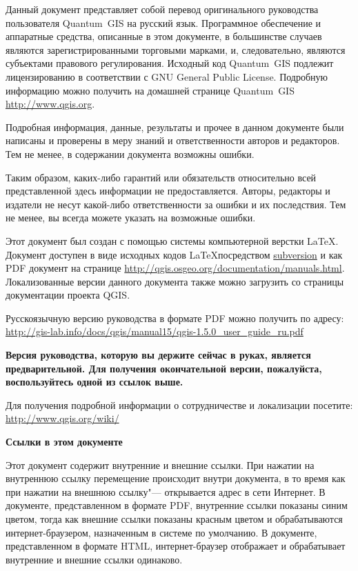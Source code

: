 \frontmatter
\pagestyle{scrplain}
\vspace{1cm}


Данный документ представляет собой перевод оригинального руководства
пользователя Quantum~GIS на русский язык. Программное обеспечение и
аппаратные средства, описанные в этом документе, в большинстве случаев
являются зарегистрированными торговыми марками, и, следовательно, являются
субъектами правового регулирования. Исходный код Quantum~GIS подлежит
лицензированию в соответствии с GNU General Public License. Подробную
информацию можно получить на домашней странице Quantum~GIS
\url{http://www.qgis.org}.
\par\bigskip
Подробная информация, данные, результаты и прочее в данном документе
были написаны и проверены в меру знаний и ответственности авторов и
редакторов. Тем не менее, в содержании документа возможны ошибки.
\par\bigskip
Таким образом, каких-либо гарантий или обязательств
относительно всей представленной здесь информации не предоставляется.
Авторы, редакторы и издатели не несут какой-либо ответственности за ошибки
и их последствия. Тем не менее, вы всегда можете указать на возможные ошибки.
\par\bigskip
Этот документ был создан с помощью системы компьютерной верстки \LaTeX.
Документ доступен в виде исходных кодов \LaTeX посредством
\href{http://wiki.qgis.org/qgiswiki/DocumentationWritersCorner}{subversion}
и как PDF документ на странице
\url{http://qgis.osgeo.org/documentation/manuals.html}.
Локализованные версии данного документа также можно загрузить со
страницы документации проекта QGIS.

Русскоязычную версию руководства в формате PDF можно получить по адресу:\\
\url{http://gis-lab.info/docs/qgis/manual15/qgis-1.5.0_user_guide_ru.pdf}

\textbf{Версия руководства, которую вы держите сейчас в руках, является
предварительной. Для получения окончательной версии, пожалуйста,
воспользуйтесь одной из ссылок выше.}

Для получения подробной информации о сотрудничестве и локализации
посетите: \url{http://www.qgis.org/wiki/}

\vspace{1cm}
\noindent
\textbf{Ссылки в этом документе}
\par\bigskip
Этот документ содержит внутренние и внешние ссылки. При нажатии на
внутреннюю ссылку перемещение происходит внутри документа, в то время
как при нажатии на внешнюю ссылку"--- открывается адрес в сети Интернет.
В документе, представленном в формате PDF, внутренние ссылки показаны
синим цветом, тогда как внешние ссылки показаны красным цветом и
обрабатываются интернет-браузером, назначенным в системе по умолчанию. В
документе, представленном в формате HTML, интернет-браузер отображает и
обрабатывает внутренние и внешние ссылки одинаково.

